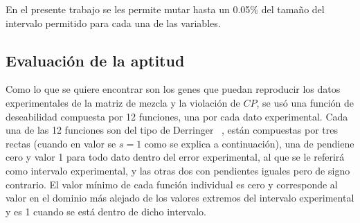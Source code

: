 En el presente trabajo se les permite mutar hasta un 0.05\% del tama\~no del 
intervalo permitido para cada una de las variables.

 
\subsection{Evaluaci\'on de la aptitud}
Como lo que se quiere encontrar son los genes que puedan reproducir los datos
experimentales de la matriz de mezcla y la violaci\'on de $CP$, se us\'o una 
funci\'on de deseabilidad compuesta por 12 funciones, una por cada dato 
experimental. Cada una de las 12 funciones son del tipo de Derringer
~\cite{rayon}, est\'an compuestas por tres rectas (cuando en valor se $s=1$ como
se explica a continuaci\'on), una de pendiene cero y valor
1 para todo dato dentro del error experimental, al que se le referir\'a como
intervalo experimental,  y las otras dos con pendientes iguales pero de signo
contrario. El valor m\'inimo de cada funci\'on individual es cero y corresponde
al valor en el dominio m\'as alejado de los valores extremos del intervalo
experimental y es 1 cuando se est\'a dentro de dicho intervalo.

